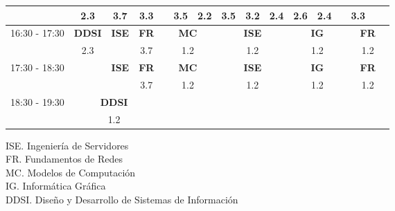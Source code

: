 \documentclass[10pt,spanish, landscape]{article}
\begin{document}
\begin{minipage}{0.7\textwidth}
\begin{tabular}{|c|ccc|ccc|ccc|ccc|ccc|}
 & {\footnotesize 2.3} & {\footnotesize 3.7} & {\footnotesize 3.3} & {\footnotesize  } & {\footnotesize 3.5} & {\footnotesize 2.2} & {\footnotesize 3.5} & {\footnotesize 3.2} & {\footnotesize 2.4} & {\footnotesize 2.6} & {\footnotesize 2.4} & {\footnotesize } & {\footnotesize 3.3} & {\footnotesize } & {\footnotesize  }\\ 
 \hline
\multirow{2}{*}{16:30 - 17:30}  & \textbf{DDSI} & \textbf{ISE} & \textbf{FR}& \multicolumn{3}{|c|}{ \cellcolor{grisclaro} \textbf{MC}}& \multicolumn{3}{|c|}{ \cellcolor{grisclaro} \textbf{ISE}}& \multicolumn{3}{|c|}{ \cellcolor{grisclaro} \textbf{IG}}& \multicolumn{3}{|c|}{ \cellcolor{grisclaro} \textbf{FR}}\\ 
 & {\footnotesize 2.3} & {\footnotesize  } & {\footnotesize 3.7}& \multicolumn{3}{|c|}{ \cellcolor{grisclaro} {\footnotesize 1.2}}& \multicolumn{3}{|c|}{ \cellcolor{grisclaro} {\footnotesize 1.2}}& \multicolumn{3}{|c|}{ \cellcolor{grisclaro} {\footnotesize 1.2}}& \multicolumn{3}{|c|}{ \cellcolor{grisclaro} {\footnotesize 1.2}}\\ 
 \hline
\multirow{2}{*}{17:30 - 18:30}  & \textbf{} & \textbf{ISE} & \textbf{FR}& \multicolumn{3}{|c|}{ \cellcolor{grisclaro} \textbf{MC}}& \multicolumn{3}{|c|}{ \cellcolor{grisclaro} \textbf{ISE}}& \multicolumn{3}{|c|}{ \cellcolor{grisclaro} \textbf{IG}}& \multicolumn{3}{|c|}{ \cellcolor{grisclaro} \textbf{FR}}\\ 
 & {\footnotesize } & {\footnotesize  } & {\footnotesize 3.7}& \multicolumn{3}{|c|}{ \cellcolor{grisclaro} {\footnotesize 1.2}}& \multicolumn{3}{|c|}{ \cellcolor{grisclaro} {\footnotesize 1.2}}& \multicolumn{3}{|c|}{ \cellcolor{grisclaro} {\footnotesize 1.2}}& \multicolumn{3}{|c|}{ \cellcolor{grisclaro} {\footnotesize 1.2}}\\ 
 \hline
\multirow{2}{*}{18:30 - 19:30} & \multicolumn{3}{|c|}{ \cellcolor{grisclaro} \textbf{DDSI}} &  &  &  &  &  &  &  &  &  &  &  & \\ 
& \multicolumn{3}{|c|}{ \cellcolor{grisclaro} {\footnotesize 1.2}} &  &  &  &  &  &  &  &  &  &  &  & \\ 
 \hline

\end{tabular}
\end{minipage}
\begin{minipage}{0.25\textwidth}
ISE. Ingeniería de Servidores\\[0.5cm]
FR. Fundamentos de Redes\\[0.5cm]
MC. Modelos de Computación\\[0.5cm]
IG. Informática Gráfica\\[0.5cm]
DDSI. Diseño y Desarrollo de Sistemas de Información\\[0.5cm]
\end{minipage}
\newpage
\end{document}
